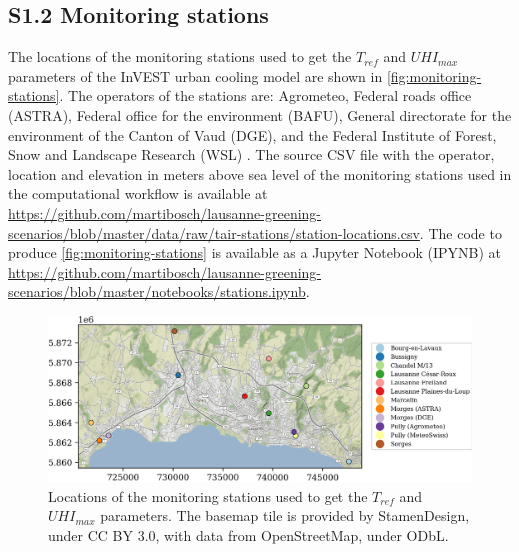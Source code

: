 \documentclass[10pt,letterpaper]{article}
\begin{document}


\subsection*{S1.2 Monitoring stations}
\label{sec:monitoring-stations}

The locations of the monitoring stations used to get the $T_{ref}$ and $UHI_{max}$ parameters of the InVEST urban cooling model are shown in \autoref{fig:monitoring-stations}. The operators of the stations are: Agrometeo, Federal roads office (ASTRA), Federal office for the environment (BAFU), General directorate for the environment of the Canton of Vaud (DGE), and the Federal Institute of Forest, Snow and Landscape Research (WSL) \cite{rebetez2018meteorological}.
The source CSV file with the operator, location and elevation in meters above sea level of the monitoring stations used in the computational workflow is available at \url{https://github.com/martibosch/lausanne-greening-scenarios/blob/master/data/raw/tair-stations/station-locations.csv}.
The code to produce \autoref{fig:monitoring-stations} is available as a Jupyter Notebook (IPYNB) at \url{https://github.com/martibosch/lausanne-greening-scenarios/blob/master/notebooks/stations.ipynb}.

\begin{figure}[H]
  \centering
  \includegraphics[width=.98\textwidth]{figures/monitoring-stations}
  \caption{\label{fig:monitoring-stations} Locations of the monitoring stations used to get the $T_{ref}$ and $UHI_{max}$ parameters. The basemap tile is provided by StamenDesign, under CC BY 3.0, with data from OpenStreetMap, under ODbL.}
\end{figure}
\end{document}
